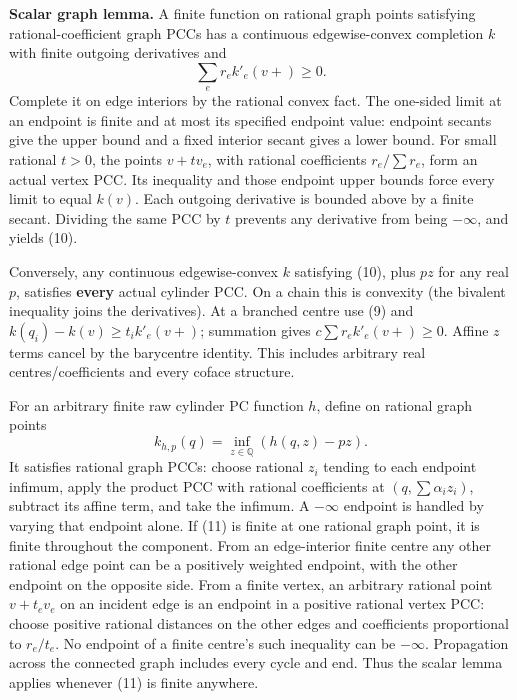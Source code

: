 \documentclass[
  11pt,
]{article}
\begin{document}
\textbf{Scalar graph lemma.} A finite function on rational graph points
satisfying rational-coefficient graph PCCs has a continuous
edgewise-convex completion \(k\) with finite outgoing derivatives and \[
                              \sum_e r_e k'_e(v+)\geq0.        \tag{10}
\] Complete it on edge interiors by the rational convex fact. The
one-sided limit at an endpoint is finite and at most its specified
endpoint value: endpoint secants give the upper bound and a fixed
interior secant gives a lower bound. For small rational \(t>0\), the
points \(v+t v_e\), with rational coefficients \(r_e/\sum r_e\), form an
actual vertex PCC. Its inequality and those endpoint upper bounds force
every limit to equal \(k(v)\). Each outgoing derivative is bounded above
by a finite secant. Dividing the same PCC by \(t\) prevents any
derivative from being \(-\infty\), and yields (10).

Conversely, any continuous edgewise-convex \(k\) satisfying (10), plus
\(pz\) for any real \(p\), satisfies \textbf{every} actual cylinder PCC.
On a chain this is convexity (the bivalent inequality joins the
derivatives). At a branched centre use (9) and
\(k(q_i)-k(v)\geq t_i k'_e(v+)\); summation gives
\(c\sum r_e k'_e(v+)\geq0\). Affine \(z\) terms cancel by the barycentre
identity. This includes arbitrary real centres/coefficients and every
coface structure.

For an arbitrary finite raw cylinder PC function \(h\), define on
rational graph points \[
 k_{h,p}(q)=\inf_{z\in\mathbb Q}(h(q,z)-pz).                 \tag{11}
\] It satisfies rational graph PCCs: choose rational \(z_i\) tending to
each endpoint infimum, apply the product PCC with rational coefficients
at \((q,\sum\alpha_i z_i)\), subtract its affine term, and take the
infimum. A \(-\infty\) endpoint is handled by varying that endpoint
alone. If (11) is finite at one rational graph point, it is finite
throughout the component. From an edge-interior finite centre any other
rational edge point can be a positively weighted endpoint, with the
other endpoint on the opposite side. From a finite vertex, an arbitrary
rational point \(v+t_ev_e\) on an incident edge is an endpoint in a
positive rational vertex PCC: choose positive rational distances on the
other edges and coefficients proportional to \(r_e/t_e\). No endpoint of
a finite centre's such inequality can be \(-\infty\). Propagation across
the connected graph includes every cycle and end. Thus the scalar lemma
applies whenever (11) is finite anywhere.
\end{document}
